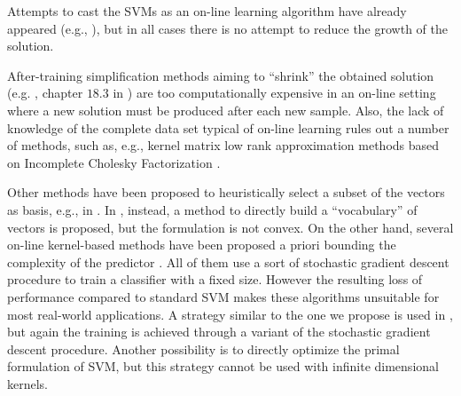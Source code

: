 Attempts to cast the SVMs as an on-line learning algorithm have already
appeared (e.g., \cite{CauwenberghsP00,DomeniconiG01,SyedLS99,BordesEWB05}), but
in all cases there is no attempt to reduce the growth of the solution.

After-training simplification methods aiming to ``shrink'' the obtained solution
(e.g. \cite{DownsGM01,NguyenH05}, chapter $18.3$ in \cite{SmolaS02}) are
too computationally expensive
in an on-line setting where a new solution must be produced after each new
sample.
Also, the lack of knowledge of the complete
data set typical of on-line learning rules out a number of methods, 
such as, e.g., kernel matrix low rank approximation methods
based on Incomplete Cholesky Factorization
\cite{FineS02,Baudat03,BachJordan2005}.

Other methods have been proposed to heuristically select a subset of the
vectors as basis, e.g., in \cite{LeeM01,KeerthiCDC06}. In
\cite{WuSB06}, instead, a method to directly build a ``vocabulary'' of
vectors is proposed, but the formulation is not convex.
On the other hand, several on-line kernel-based methods have been proposed 
a priori bounding the complexity of the predictor
\cite{EngelMM04,KivinenSW04,WestonBB05,ChengVSWC07}.
All of them use a sort of stochastic gradient descent procedure to train a
classifier with a fixed size. However the resulting loss of performance compared
to standard SVM makes these algorithms unsuitable for most real-world applications.
A strategy similar to the one we propose is used in \cite{CsatoO01}, but
again the training is achieved through a variant of the stochastic gradient
descent procedure.
Another possibility is to directly optimize the primal formulation of SVM,
but this strategy cannot be used with infinite dimensional kernels.


